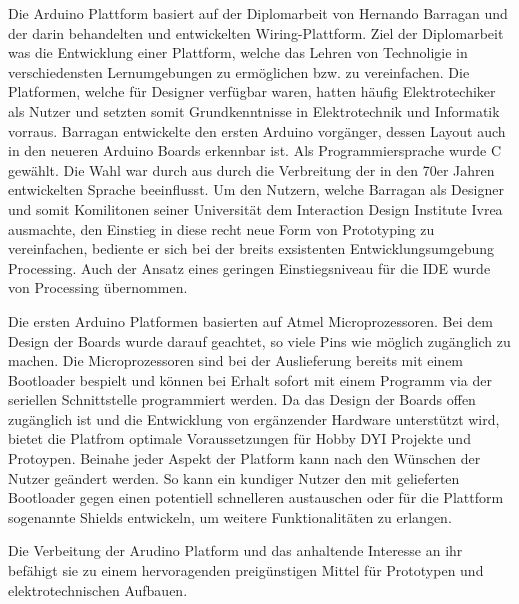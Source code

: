 Die Arduino Plattform basiert auf der Diplomarbeit von Hernando Barragan und der darin behandelten und entwickelten Wiring-Plattform. Ziel der Diplomarbeit was die Entwicklung einer Plattform, welche das Lehren von Technoligie in verschiedensten Lernumgebungen zu ermöglichen bzw. zu vereinfachen\cite{hernandobarraganwiring2004}. Die Platformen, welche für Designer verfügbar waren, hatten häufig Elektrotechiker als Nutzer und setzten somit Grundkenntnisse in Elektrotechnik und Informatik vorraus. Barragan entwickelte den ersten Arduino vorgänger, dessen Layout auch in den neueren Arduino Boards erkennbar ist. Als Programmiersprache wurde C gewählt. Die Wahl war durch aus durch die Verbreitung der in den 70er Jahren entwickelten Sprache beeinflusst. Um den Nutzern, welche Barragan als Designer und somit Komilitonen seiner Universität dem Interaction Design Institute Ivrea ausmachte, den Einstieg in diese recht neue Form von Prototyping zu vereinfachen, bediente er sich bei der breits exsistenten Entwicklungsumgebung Processing\cite{caseyreasprocessing2001}. Auch der Ansatz eines geringen Einstiegsniveau für die IDE wurde von Processing übernommen.



Die ersten Arduino Platformen basierten auf Atmel Microprozessoren. Bei dem Design der Boards wurde darauf geachtet, so viele Pins wie möglich zugänglich zu machen. Die Microprozessoren sind bei der Auslieferung bereits mit einem Bootloader bespielt und können bei Erhalt sofort mit einem Programm via der seriellen Schnittstelle programmiert werden. Da das Design der Boards offen zugänglich ist und die Entwicklung von ergänzender Hardware unterstützt wird, bietet die Platfrom optimale Voraussetzungen für Hobby DYI Projekte und Protoypen. Beinahe jeder Aspekt der Platform kann nach den Wünschen der Nutzer geändert werden. So kann ein kundiger Nutzer den mit gelieferten Bootloader gegen einen potentiell schnelleren austauschen oder für die Plattform sogenannte Shields entwickeln, um weitere Funktionalitäten zu erlangen.

Die Verbeitung der Arudino Platform und das anhaltende Interesse an ihr\cite{google} befähigt sie zu einem hervoragenden preigünstigen Mittel für Prototypen und elektrotechnischen Aufbauen.
